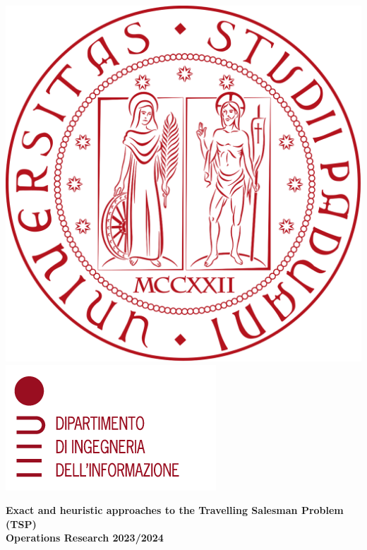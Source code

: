 \documentclass[12pt]{article}
\begin{document}
\begin{titlepage}
\begin{center}

\begin{mybox_no_borders}{}
    \includegraphics[scale=0.25, left]{images/logo_unipd.png}
    \tcblower
    \includegraphics[scale=0.4, right]{images/logo_dei.png}
\end{mybox_no_borders}
\vspace{4cm}
\textbf{\LARGE Exact and heuristic approaches to the Travelling Salesman Problem (TSP)}\\

\vspace{1.5cm}
\textbf{\large Operations Research 2023/2024}\\


\end{center}
\end{titlepage}
\end{document}

